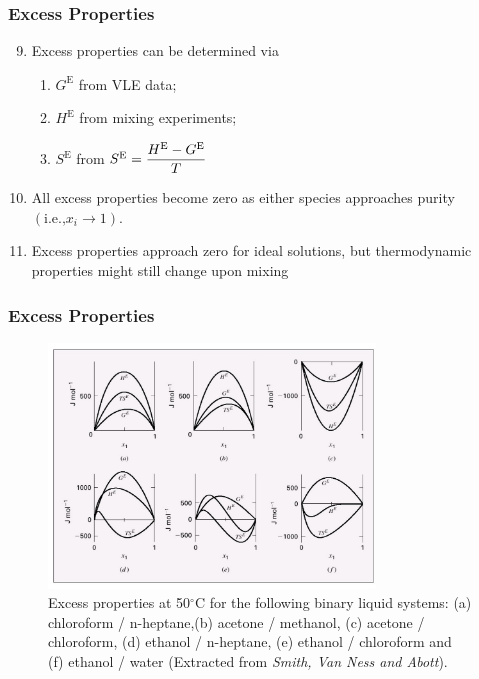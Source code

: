 \documentclass[10pt,compress,unknownkeysallowed]{beamer}
\begin{document}
\begin{frame}
  \frametitle{Excess Properties}
  \begin{enumerate}\setcounter{enumi}{8}
      \item<1-> Excess properties can be determined via
         \begin{enumerate}
            \item<1-> $G^{\text{E}}$ from VLE data;
            \item<1-> $H^{\text{E}}$ from mixing experiments;
            \item<1-> $S^{\text{E}}$ from $S^{\text{E}}=\displaystyle\frac{H^{\text{E}}-G^{\text{E}}}{T}$
         \end{enumerate}
      \item<2-> All excess properties become zero as either species approaches purity $\left(\text{i.e.,} x_{i}\rightarrow 1\right)$.
      \item<3-> Excess properties approach zero for ideal solutions, but thermodynamic properties might still change upon mixing
  \end{enumerate}
\end{frame}
\normalsize

\scriptsize
\begin{frame} 
  \frametitle{Excess Properties}
     \begin{center}
       \begin{figure}
         \includegraphics[width=9.cm, height=6.5cm,clip]{../Pics/ExcessProperties_Plot}
          \caption{\scriptsize Excess properties at 50$^{\circ}$C for the following binary liquid systems: (a) chloroform / n-heptane,(b) acetone / methanol, (c) acetone / chloroform, (d) ethanol / n-heptane, (e) ethanol / chloroform and (f) ethanol / water (Extracted from {\it Smith, Van Ness and Abott}). }
       \end{figure}
     \end{center}
\end{frame}
\normalsize
\end{document}
